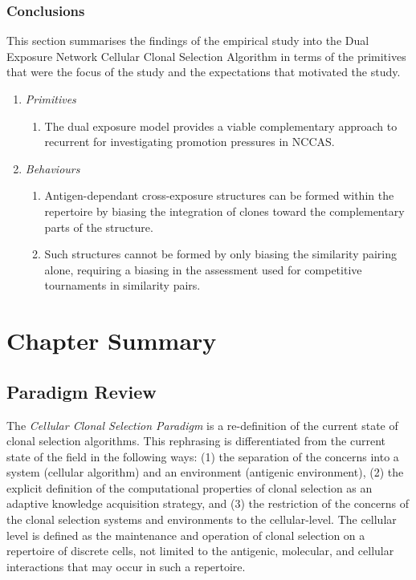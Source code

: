 %
%
\subsubsection{Conclusions}
This section summarises the findings of the empirical study into the Dual Exposure Network Cellular Clonal Selection Algorithm in terms of the primitives that were the focus of the study and the expectations that motivated the study.

\begin{enumerate}
	\item \emph{Primitives}
	\begin{enumerate}
		\item The dual exposure model provides a viable complementary approach to recurrent for investigating promotion pressures in NCCAS.
	\end{enumerate}
	
	\item \emph{Behaviours}
	\begin{enumerate}
		\item Antigen-dependant cross-exposure structures can be formed within the repertoire by biasing the integration of clones toward the complementary parts of the structure.
		\item Such structures cannot be formed by only biasing the similarity pairing alone, requiring a biasing in the assessment used for competitive tournaments in similarity pairs.
	\end{enumerate}		
\end{enumerate}

%
%
\section{Chapter Summary}
\label{sec:cells:summary}

%
%
\subsection{Paradigm Review}
The \emph{Cellular Clonal Selection Paradigm} is a re-definition of the current state of clonal selection algorithms. This rephrasing is differentiated from the current state of the field in the following ways: (1) the separation of the concerns into a system (cellular algorithm) and an environment (antigenic environment), (2) the explicit definition of the computational properties of clonal selection as an adaptive knowledge acquisition strategy, and (3) the restriction of the concerns of the clonal selection systems and environments to the cellular-level. The cellular level is defined as the maintenance and operation of clonal selection on a repertoire of discrete cells, not limited to the antigenic, molecular, and cellular interactions that may occur in such a repertoire. 

